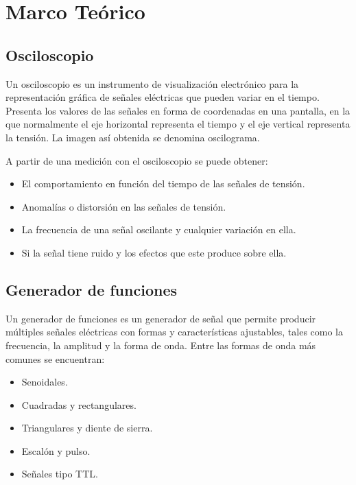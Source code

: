 \documentclass{article}
\begin{document}
    \section{Marco Teórico}

    \subsection{Osciloscopio}

    Un osciloscopio es un instrumento de visualización electrónico para la representación gráfica de señales eléctricas que pueden variar en el tiempo. Presenta los valores de las señales en forma de coordenadas en una pantalla, en la que normalmente el eje horizontal representa el tiempo y el eje vertical representa la tensión. La imagen así obtenida se denomina oscilograma.

    A partir de una medición con el osciloscopio se puede obtener:

    \begin{itemize}
        \item El comportamiento en función del tiempo de las señales de tensión.
        \item Anomalías o distorsión en las señales de tensión.
        \item La frecuencia de una señal oscilante y cualquier variación en ella.
        \item Si la señal tiene ruido y los efectos que este produce sobre ella.
    \end{itemize}

    \subsection{Generador de funciones}

    Un generador de funciones es un generador de señal que permite producir múltiples señales eléctricas con formas y características ajustables, tales como la frecuencia, la amplitud y la forma de onda. Entre las formas de onda más comunes se encuentran:

    \begin{itemize}
        \item Senoidales.
        \item Cuadradas y rectangulares.
        \item Triangulares y diente de sierra.
        \item Escalón y pulso.
        \item Señales tipo TTL.
    \end{itemize}
\end{document}
